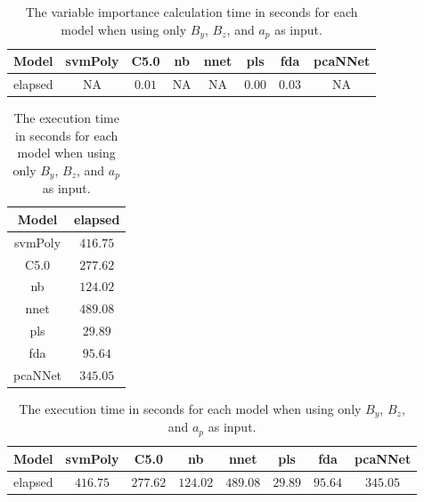 \begin{table}[!ht]
	\centering
	\begin{tabular}{|c|c|c|c|c|c|c|c|}
		\hline
		Model & svmPoly & C5.0 & nb & nnet & pls & fda & pcaNNet \\ \hline
		elapsed & NA & $0.01$ & NA & NA & $0.00$ & $0.03$ & NA \\ \hline
	\end{tabular}
	\caption{The variable importance calculation time in seconds for each model when using only $B_{y}$, $B_{z}$, and $a_{p}$ as input.}
	\label{tab:time:reverse:yzap:importance}
\end{table}

\begin{table}[!ht]
	\centering
	\begin{tabular}{|c|c|}
		\hline
		Model & elapsed \\ \hline
		svmPoly & $416.75$ \\ \hline
		C5.0 & $277.62$ \\ \hline
		nb & $124.02$ \\ \hline
		nnet & $489.08$ \\ \hline
		pls & $29.89$ \\ \hline
		fda & $95.64$ \\ \hline
		pcaNNet & $345.05$ \\ \hline
	\end{tabular}
	\caption{The execution time in seconds for each model when using only $B_{y}$, $B_{z}$, and $a_{p}$ as input.}
	\label{tab:time:yzap:total}
\end{table}

\begin{table}[!ht]
	\centering
	\begin{tabular}{|c|c|c|c|c|c|c|c|}
		\hline
		Model & svmPoly & C5.0 & nb & nnet & pls & fda & pcaNNet \\ \hline
		elapsed & $416.75$ & $277.62$ & $124.02$ & $489.08$ & $29.89$ & $95.64$ & $345.05$ \\ \hline
	\end{tabular}
	\caption{The execution time in seconds for each model when using only $B_{y}$, $B_{z}$, and $a_{p}$ as input.}
	\label{tab:time:reverse:yzap:total}
\end{table}

